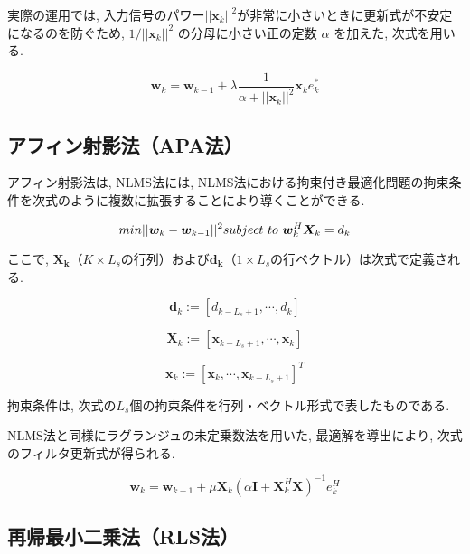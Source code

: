 実際の運用では, 入力信号のパワー\(||\bm{x}_k||^2\)が非常に小さいときに更新式が不安定になるのを防ぐため, \(
1 / ||{}\bm{x}_k||^2 \)
の分母に小さい正の定数 \(\alpha\) を加えた, 次式を用いる. 

\begin{equation}
\bm{w}_k = \bm{w}_{k-1} + \lambda \frac{1}{\alpha + ||\bm{x}_k||^2} \bm{x}_k e_k^*
\end{equation}

\subsection{アフィン射影法（APA法）}\label{apa}

アフィン射影法は, NLMS法には, NLMS法における拘束付き最適化問題の拘束条件を次式のように複数に拡張することにより導くことができる. 

\begin{equation}
min ||\bm{w}_k - \bm{w}_{k-1}||^2 \\ 
subject \ to \ \bm{w}_k^H \bm{X}_k = d_k
\end{equation}


ここで, \(\bm{X_k}\)（\(K \times L_s\)の行列）および\(\bm{d_k}\)（\(1 \times L_s\)の行ベクトル）は次式で定義される. 


\begin{equation}
\bm{d}_k := [d_{k-L_s+1}, \cdots, d_k]
\end{equation}

\begin{equation}
\bm{X}_k := [\bm{x}_{k-L_s+1}, \cdots, \bm{x}_k]
\end{equation}

\begin{equation}
\bm{x}_k := [\bm{x}_{k}, \cdots, \bm{x}_{k-L_s+1}]^T
\end{equation}

拘束条件は, 次式の\(L_s\)個の拘束条件を行列・ベクトル形式で表したものである. 

NLMS法と同様にラグランジュの未定乗数法を用いた, 最適解を導出により, 次式のフィルタ更新式が得られる. 

\begin{equation}
\bm{w}_k = \bm{w}_{k-1} + \mu \bm{X}_k ( \alpha \bm{I} + \bm{X}_k^H \bm{X} )^{-1} e_k^H
\end{equation}



\subsection{再帰最小二乗法（RLS法）}\label{rls}

